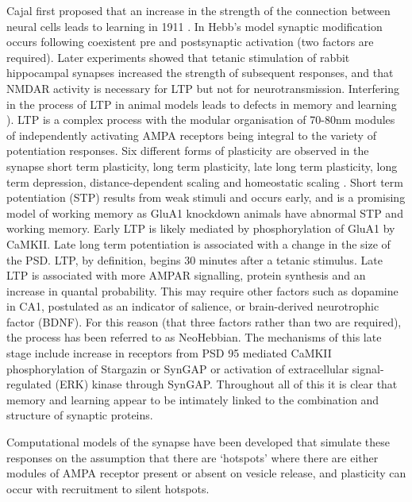 Cajal first proposed that an increase in the strength of the connection between neural cells leads to learning in 1911 \cite{nicoll2017brief}. In Hebb's model synaptic modification occurs following coexistent pre and postsynaptic activation (two factors are required)\cite{hebb1949organization_check}. Later experiments showed that tetanic stimulation of rabbit hippocampal synapses increased the strength of subsequent responses\cite{bliss1973long}, and that NMDAR activity is necessary for LTP\cite{collingridge1983excitatory} but not for neurotransmission. 
 Interfering in the process of LTP in animal models leads to defects in memory and learning \cite{lisman2012mechanisms}).
LTP is a complex process with the modular organisation of 70-80nm modules of independently activating AMPA receptors being integral to the variety of potentiation responses\cite{lisman2017glutamatergic}. Six different forms of plasticity are observed in the synapse short term plasticity, long term plasticity, late long term plasticity, long term depression, distance-dependent scaling and homeostatic scaling \cite{lisman2017glutamatergic}. Short term potentiation (STP) results from weak stimuli and occurs early, and is a promising model of working memory as GluA1 knockdown animals have abnormal STP and working memory\cite{lisman2017glutamatergic}. Early LTP is likely mediated by phosphorylation of GluA1 by CaMKII. Late long term potentiation is associated with a change in the size of the PSD. LTP, by definition, begins 30 minutes after a tetanic stimulus. Late LTP is associated with more AMPAR signalling, protein synthesis\cite{park2018ampa} and an increase in quantal probability. This may require other factors such as dopamine in CA1, postulated as an indicator of salience, or brain-derived neurotrophic factor (BDNF). For this reason (that three factors rather than two are required), the process has been referred to as NeoHebbian\cite{lisman2017glutamatergic}. The mechanisms of this late stage include increase in receptors from PSD 95 mediated CaMKII phosphorylation of Stargazin or SynGAP or activation of extracellular signal-regulated (ERK) kinase through SynGAP. Throughout all of this it is clear that memory and learning appear to be intimately linked to  the combination and structure of synaptic proteins. 

 
 
Computational models of the synapse have been developed that simulate these responses on the assumption that there are `hotspots' where there are either modules of AMPA receptor present or absent on vesicle release, and plasticity can occur with recruitment to silent hotspots\cite{lisman2017glutamatergic}.
 
